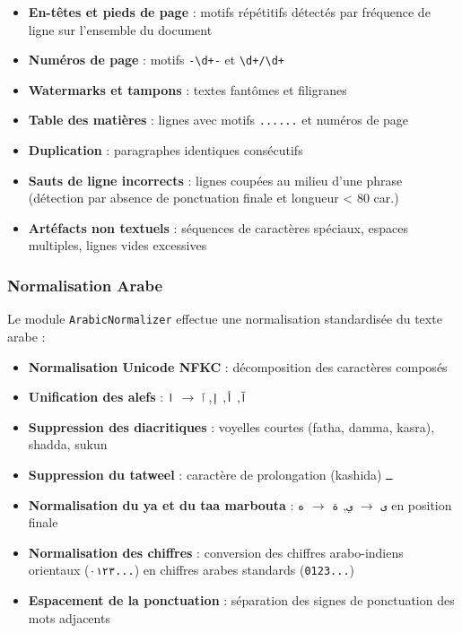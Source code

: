 \begin{itemize}
    \item \textbf{En-têtes et pieds de page} : motifs répétitifs détectés par
    fréquence de ligne sur l'ensemble du document
    \item \textbf{Numéros de page} : motifs \texttt{-\textbackslash d+-} et
    \texttt{\textbackslash d+/\textbackslash d+}
    \item \textbf{Watermarks et tampons} : textes fantômes et filigranes
    \item \textbf{Table des matières} : lignes avec motifs
    \texttt{......} et numéros de page
    \item \textbf{Duplication} : paragraphes identiques consécutifs
    \item \textbf{Sauts de ligne incorrects} : lignes coupées au milieu d'une
    phrase (détection par absence de ponctuation finale et longueur < 80 car.)
    \item \textbf{Artéfacts non textuels} : séquences de caractères spéciaux,
    espaces multiples, lignes vides excessives
\end{itemize}

\subsubsection{Normalisation Arabe}

Le module \texttt{ArabicNormalizer} \cite{src:normalizer} effectue une
normalisation standardisée du texte arabe :

\begin{itemize}
    \item \textbf{Normalisation Unicode NFKC} : décomposition des caractères
    composés
    \item \textbf{Unification des alefs} : \texttt{آ}, \texttt{أ}, \texttt{إ},
    \texttt{ٱ} $\rightarrow$ \texttt{ا}
    \item \textbf{Suppression des diacritiques} : voyelles courtes
    (fatha, damma, kasra), shadda, sukun
    \item \textbf{Suppression du tatweel} : caractère de prolongation
    (kashida) \texttt{ـ}
    \item \textbf{Normalisation du ya et du taa marbouta} : \texttt{ى}
    $\rightarrow$ \texttt{ي}, \texttt{ة} $\rightarrow$ \texttt{ه} en
    position finale
    \item \textbf{Normalisation des chiffres} : conversion des chiffres
    arabo-indiens orientaux (\texttt{٠١٢٣...}) en chiffres arabes standards
    (\texttt{0123...})
    \item \textbf{Espacement de la ponctuation} : séparation des signes de
    ponctuation des mots adjacents
\end{itemize}

